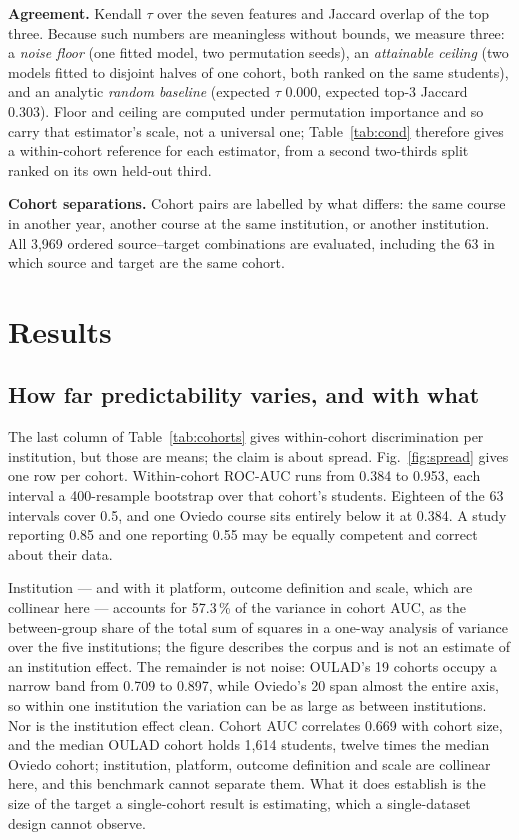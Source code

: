 \documentclass[conference]{IEEEtran}
\begin{document}
\textbf{Agreement.} Kendall $\tau$ over the seven features and Jaccard overlap of
the top three. Because such numbers are meaningless without bounds, we measure
three: a \emph{noise floor} (one fitted model, two permutation seeds), an \emph{attainable ceiling} (two models fitted to disjoint halves of one cohort, both ranked on the same students), and an analytic \emph{random baseline} (expected $\tau$ 0.000, expected top-3 Jaccard 0.303). Floor and ceiling are computed under permutation importance and so carry that estimator's scale, not a universal one; Table~\ref{tab:cond} therefore gives a within-cohort reference for each estimator, from a second two-thirds split ranked on its own held-out third.

\textbf{Cohort separations.} Cohort pairs are labelled by what differs: the same
course in another year, another course at the same institution, or another
institution. All 3{,}969 ordered source--target combinations are evaluated, including the 63 in which source and target are the same cohort.

\section{Results}

\subsection{How far predictability varies, and with what}\label{sec:pred}

The last column of Table~\ref{tab:cohorts} gives within-cohort discrimination per
institution, but those are means; the claim is about spread.
Fig.~\ref{fig:spread} gives one row per cohort. Within-cohort ROC-AUC runs from
0.384 to 0.953, each interval a 400-resample bootstrap over that
cohort's students. Eighteen of the 63 intervals cover 0.5, and one Oviedo course sits
entirely below it at 0.384. A study reporting 0.85 and one reporting 0.55 may
be equally competent and correct about their data.

Institution --- and with it platform, outcome definition and scale, which are collinear here --- accounts for 57.3\,\% of the variance in cohort AUC, as the between-group share of the total sum of squares in a one-way analysis of variance over the five institutions; the figure describes the corpus and is not an estimate of an institution effect. The remainder is
not noise: OULAD's 19 cohorts occupy a narrow band from 0.709 to 0.897, while
Oviedo's 20 span almost the entire axis, so within one institution the variation
can be as large as between institutions. Nor is the institution effect clean.
Cohort AUC correlates 0.669 with cohort size, and the median OULAD cohort
holds 1{,}614 students, twelve times the median Oviedo cohort; institution, platform, outcome definition
and scale are collinear here, and this benchmark cannot separate them. What it
does establish is the size of the target a single-cohort result is estimating,
which a single-dataset design cannot observe.
\end{document}
